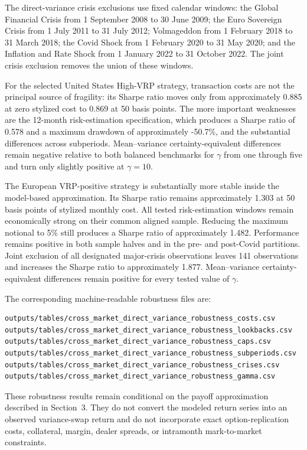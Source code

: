 The direct-variance crisis exclusions use fixed calendar windows:
the Global Financial Crisis from 1 September 2008 to 30 June 2009;
the Euro Sovereign Crisis from 1 July 2011 to 31 July 2012;
Volmageddon from 1 February 2018 to 31 March 2018;
the Covid Shock from 1 February 2020 to 31 May 2020; and
the Inflation and Rate Shock from 1 January 2022 to 31 October 2022.
The joint crisis exclusion removes the union of these windows.

For the selected United States High-VRP strategy, transaction costs are not the principal source of fragility: its Sharpe ratio moves only from approximately 0.885 at zero stylized cost to 0.869 at 50 basis points. The more important weaknesses are the 12-month risk-estimation specification, which produces a Sharpe ratio of 0.578 and a maximum drawdown of approximately -50.7\%, and the substantial differences across subperiods. Mean--variance certainty-equivalent differences remain negative relative to both balanced benchmarks for $\gamma$ from one through five and turn only slightly positive at $\gamma=10$.

The European VRP-positive strategy is substantially more stable inside the model-based approximation. Its Sharpe ratio remains approximately 1.303 at 50 basis points of stylized monthly cost. All tested risk-estimation windows remain economically strong on their common aligned sample. Reducing the maximum notional to 5\% still produces a Sharpe ratio of approximately 1.482. Performance remains positive in both sample halves and in the pre- and post-Covid partitions. Joint exclusion of all designated major-crisis observations leaves 141 observations and increases the Sharpe ratio to approximately 1.877. Mean--variance certainty-equivalent differences remain positive for every tested value of $\gamma$.

The corresponding machine-readable robustness files are:

\begin{verbatim}
outputs/tables/cross_market_direct_variance_robustness_costs.csv
outputs/tables/cross_market_direct_variance_robustness_lookbacks.csv
outputs/tables/cross_market_direct_variance_robustness_caps.csv
outputs/tables/cross_market_direct_variance_robustness_subperiods.csv
outputs/tables/cross_market_direct_variance_robustness_crises.csv
outputs/tables/cross_market_direct_variance_robustness_gamma.csv
\end{verbatim}

These robustness results remain conditional on the payoff approximation described in Section~3. They do not convert the modeled return series into an observed variance-swap return and do not incorporate exact option-replication costs, collateral, margin, dealer spreads, or intramonth mark-to-market constraints.
